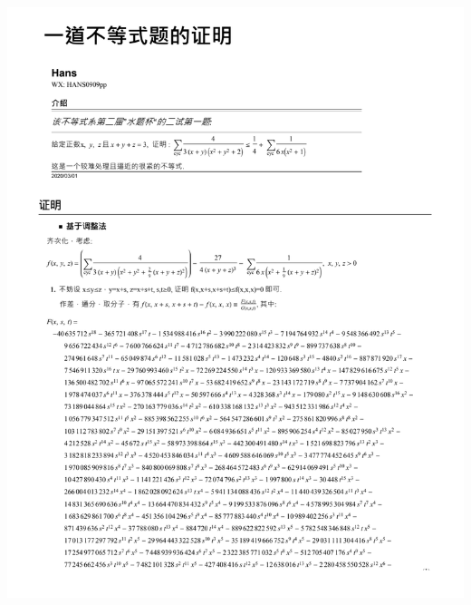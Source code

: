 \documentclass[UTF8]{ctexart}
\begin{document}
\begin{center}
	\includegraphics[width=1\linewidth]{a27}
\end{center}
\end{document}
